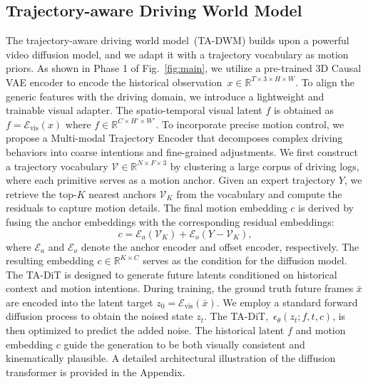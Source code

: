 \subsection{Trajectory-aware Driving World Model}
The trajectory-aware driving world model~(TA-DWM) builds upon a powerful video diffusion model, and we adapt it with a trajectory vocabulary as motion priors. As shown in Phase 1 of Fig.~\ref{fig:main}, we utilize a pre-trained 3D Causal VAE encoder to encode the historical observation~$x\in\mathbb{R}^{T \times 3 \times H \times W}$. To align the generic features with the driving domain, we introduce a lightweight and trainable visual adapter. The spatio-temporal visual latent $f$ is obtained as $f = \mathcal{E}_{\text{vis}}(x)$ where $ f\in \mathbb{R}^{C\times H' \times W'}$. To incorporate precise motion control, we propose a Multi-modal Trajectory Encoder that decomposes complex driving behaviors into coarse intentions and fine-grained adjustments. We first construct a trajectory vocabulary $\mathcal{V} \in \mathbb{R}^{N \times F \times 3}$ by clustering a large corpus of driving logs, where each primitive serves as a motion anchor. Given an expert trajectory $Y$, we retrieve the top-$K$ nearest anchors $\mathcal{V}_K$ from the vocabulary and compute the residuals to capture motion details. The final motion embedding $c$ is derived by fusing the anchor embeddings with the corresponding residual embeddings:
\begin{equation}
    c = \mathcal{E}_{a}(\mathcal{V}_K) + \mathcal{E}_{o}(Y - \mathcal{V}_K),
    \label{equ:traj_embed}
\end{equation}
where $\mathcal{E}_{a}$ and $\mathcal{E}_{o}$ denote the anchor encoder and offset encoder, respectively. The resulting embedding $c \in \mathbb{R}^{K \times C}$ serves as the condition for the diffusion model. The TA-DiT is designed to generate future latents conditioned on historical context and motion intentions. During training, the ground truth future frames $\bar{x}$ are encoded into the latent target $z_0 = \mathcal{E}_{\text{vis}}(\bar{x})$. We employ a standard forward diffusion process to obtain the noised state $z_t$. The TA-DiT,~$\epsilon_\theta({z_t; f, t, c})$, is then optimized to predict the added noise. The historical latent $f$ and motion embedding $c$ guide the generation to be both visually consistent and kinematically plausible. A detailed architectural illustration of the diffusion transformer is provided in the Appendix.

